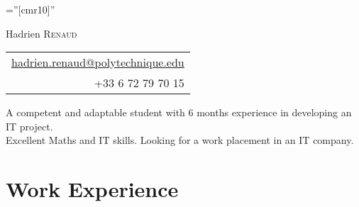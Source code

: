 \documentclass[a4paper,10pt]{article} %
\begin{document}
\pagestyle{empty} %

\font\fb=''[cmr10]'' %



\par{{\Huge Hadrien \textsc{Renaud}}\hfill
\begin{tabular}{r}
\href{mailto:hadrien.renaud@polytechnique.edu}{hadrien.renaud@polytechnique.edu}\\
+33 6 72 79 70 15
\end{tabular}
\bigskip\par} %
\vfill


A competent and adaptable student with 6 months experience in developing an IT project.\\
Excellent Maths and IT skills.
Looking for a work placement in an IT company.


\section{Work Experience}
\end{document}
